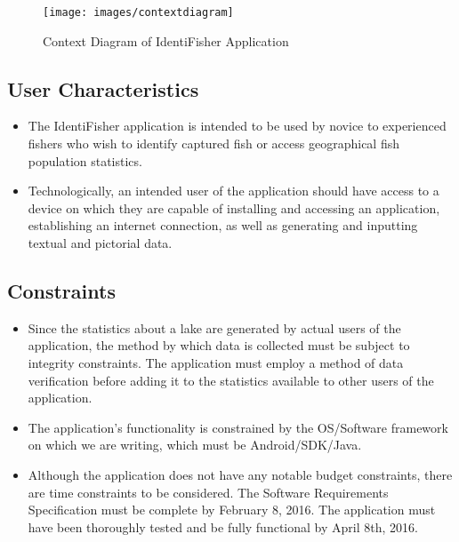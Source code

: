 \documentclass{article}
\begin{document}
\begin{figure}[H]
	\texttt{[image: images/contextdiagram]}
	\caption{Context Diagram of IdentiFisher Application}
\end{figure}


\subsection{User Characteristics}
\begin{itemize}
	\item
	The IdentiFisher application is intended to be used by novice to experienced fishers who wish to identify captured fish or access geographical fish population statistics. 
	
	\item
	Technologically, an intended user of the application should have access to a device on which they are capable of installing and accessing an application, establishing an internet connection, as well as generating and inputting textual and pictorial data. 
\end{itemize}

\subsection{Constraints}
\begin{itemize}
	\item 
	Since the statistics about a lake are generated by actual users of the application, the method by which data is collected must be subject to integrity constraints. The application must employ a method of data verification before adding it to the statistics available to other users of the application. 

	\item
	The application's functionality is constrained by the OS/Software framework on which we are writing, which must be Android/SDK/Java.

	\item
	Although the application does not have any notable budget constraints, there are time constraints to be considered. The Software Requirements Specification must be complete by February 8, 2016. The application must have been thoroughly tested and be fully functional by April 8th, 2016.
\end{itemize}
\end{document}
